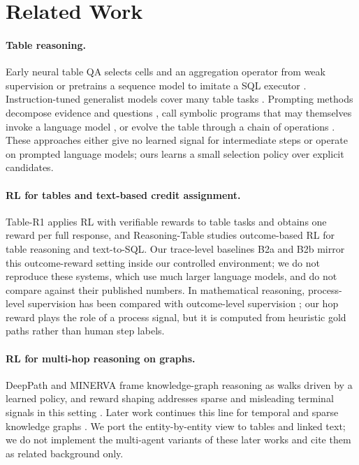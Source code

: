\section{Related Work}
\label{sec:related}

\paragraph{Table reasoning.}
Early neural table QA selects cells and an aggregation operator from weak supervision \citep{herzig2020tapas} or pretrains a sequence model to imitate a SQL executor \citep{liu2022tapex}.
Instruction-tuned generalist models cover many table tasks \citep{zhang2024tablellama}.
Prompting methods decompose evidence and questions \citep{ye2023dater}, call symbolic programs that may themselves invoke a language model \citep{cheng2023binder}, or evolve the table through a chain of operations \citep{wang2024chainoftable}.
These approaches either give no learned signal for intermediate steps or operate on prompted language models; ours learns a small selection policy over explicit candidates.

\paragraph{RL for tables and text-based credit assignment.}
Table-R1 \citep{yang2025tabler1} applies RL with verifiable rewards to table tasks and obtains one reward per full response, and Reasoning-Table \citep{lei2025reasoningtable} studies outcome-based RL for table reasoning and text-to-SQL.
Our trace-level baselines B2a and B2b mirror this outcome-reward setting inside our controlled environment; we do not reproduce these systems, which use much larger language models, and do not compare against their published numbers.
In mathematical reasoning, process-level supervision has been compared with outcome-level supervision \citep{uesato2022process,lightman2023verify}; our hop reward plays the role of a process signal, but it is computed from heuristic gold paths rather than human step labels.

\paragraph{RL for multi-hop reasoning on graphs.}
DeepPath \citep{xiong2017deeppath} and MINERVA \citep{das2018minerva} frame knowledge-graph reasoning as walks driven by a learned policy, and reward shaping addresses sparse and misleading terminal signals in this setting \citep{lin2018multihop}.
Later work continues this line for temporal and sparse knowledge graphs \citep{bai2024matpath,liu2025maskgr}.
We port the entity-by-entity view to tables and linked text; we do not implement the multi-agent variants of these later works and cite them as related background only.

